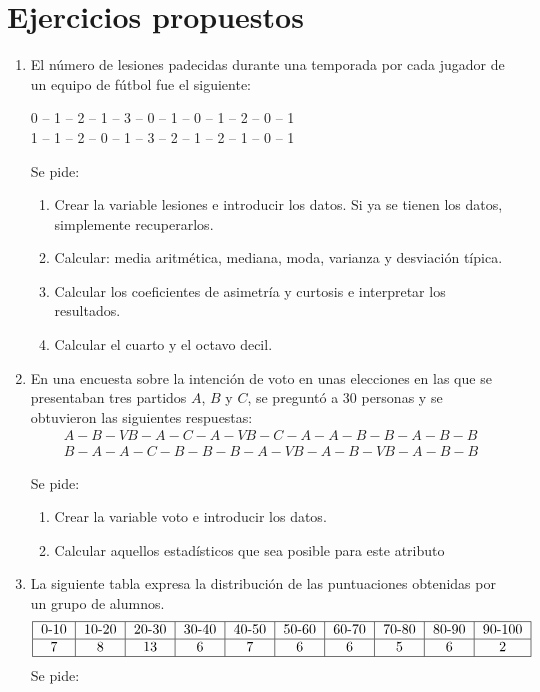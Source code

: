 \section{Ejercicios propuestos}
\begin{enumerate}[leftmargin=*]

\item  El número de lesiones padecidas durante una temporada
por cada jugador de un equipo de fútbol fue el siguiente:
\begin{center}
0 -- 1 -- 2 -- 1 -- 3 -- 0 -- 1 -- 0 -- 1 -- 2 -- 0 -- 1 \\
1 -- 1 -- 2 -- 0 -- 1 -- 3 -- 2 -- 1 -- 2 -- 1 -- 0 -- 1
\end{center}

Se pide:
\begin{enumerate}
  \item Crear la variable lesiones e introducir los datos. Si
ya se tienen los datos, simplemente recuperarlos.
  \item Calcular: media aritmética, mediana, moda, varianza y desviación típica.
  \item Calcular los coeficientes de asimetría y curtosis e interpretar los resultados.
  \item Calcular el cuarto y el octavo decil.
\end{enumerate}



\item En una encuesta sobre la intención de voto en unas
elecciones en las que se presentaban tres partidos $A$, $B$ y $C$,
se preguntó a 30 personas y se obtuvieron las siguientes
respuestas:
\[
\begin{array}{c}
A - B - VB - A - C - A - VB - C - A - A - B - B - A - B - B\\
B - A - A - C - B - B - B - A - VB - A - B - VB - A - B - B
\end{array}
\]

Se pide:

\begin{enumerate}
\item  Crear la variable voto e introducir los datos.

\item  Calcular aquellos estadísticos que sea posible para este
atributo

\end{enumerate}



\item  La siguiente tabla expresa la distribución de las puntuaciones obtenidas por un grupo de alumnos.
\[
\begin{tabular}{|c|c|c|c|c|c|c|c|c|c|}
\hline 0-10 & 10-20 & 20-30 & 30-40 & 40-50 & 50-60 & 60-70 &
70-80 & 80-90 & 90-100
\\ \hline
7 & 8 & 13 & 6 & 7 & 6 & 6 & 5 & 6 & 2 \\ \hline
\end{tabular}
\]
Se pide:


\end{enumerate}
